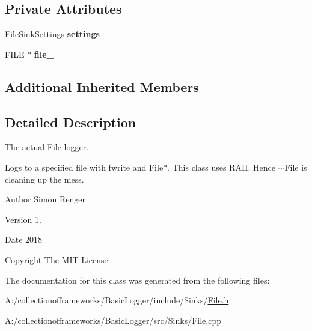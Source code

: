 \subsection*{Private Attributes}
\begin{DoxyCompactItemize}
\item 
\mbox{\label{classcof_1_1basic__logger_1_1_file_a27e2decc7e6b477428c6cc3953cb31fd}} 
\hyperlink{structcof_1_1basic__logger_1_1_file_sink_settings}{File\+Sink\+Settings} {\bfseries settings\+\_\+}
\item 
\mbox{\label{classcof_1_1basic__logger_1_1_file_acd3d0aa11a2a7369553eef83ee12710d}} 
F\+I\+LE $\ast$ {\bfseries file\+\_\+}
\end{DoxyCompactItemize}
\subsection*{Additional Inherited Members}


\subsection{Detailed Description}
The actual \hyperlink{classcof_1_1basic__logger_1_1_file}{File} logger. 

Logs to a specified file with {\ttfamily fwrite} and {\ttfamily File$\ast$}. This class uses R\+A\+II. Hence {\ttfamily $\sim$\+File} is cleaning up the mess.

\begin{DoxyAuthor}{Author}
Simon Renger 
\end{DoxyAuthor}
\begin{DoxyVersion}{Version}
1. 
\end{DoxyVersion}
\begin{DoxyDate}{Date}
2018 
\end{DoxyDate}
\begin{DoxyCopyright}{Copyright}
The M\+IT License 
\end{DoxyCopyright}


The documentation for this class was generated from the following files\+:\begin{DoxyCompactItemize}
\item 
A\+:/collectionofframeworks/\+Basic\+Logger/include/\+Sinks/\hyperlink{_file_8h}{File.\+h}\item 
A\+:/collectionofframeworks/\+Basic\+Logger/src/\+Sinks/File.\+cpp\end{DoxyCompactItemize}
